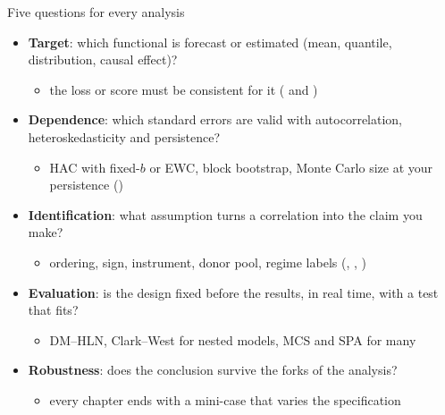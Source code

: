 \begin{frame}{Five questions for every analysis}
\itemsize{\footnotesize}
\begin{itemize}
    \item \textbf{Target}: which functional is forecast or estimated (mean, quantile, distribution, causal effect)?
    \begin{itemize}
        \item the loss or score must be consistent for it ( and )
    \end{itemize}
    \item \textbf{Dependence}: which standard errors are valid with autocorrelation, heteroskedasticity and persistence?
    \begin{itemize}
        \item HAC with fixed-$b$ or EWC, block bootstrap, Monte Carlo size at your persistence ()
    \end{itemize}
    \item \textbf{Identification}: what assumption turns a correlation into the claim you make?
    \begin{itemize}
        \item ordering, sign, instrument, donor pool, regime labels (, , )
    \end{itemize}
    \item \textbf{Evaluation}: is the design fixed before the results, in real time, with a test that fits?
    \begin{itemize}
        \item DM--HLN, Clark--West for nested models, MCS and SPA for many
    \end{itemize}
    \item \textbf{Robustness}: does the conclusion survive the forks of the analysis?
    \begin{itemize}
        \item every chapter ends with a mini-case that varies the specification
    \end{itemize}
\end{itemize}
\end{frame}

